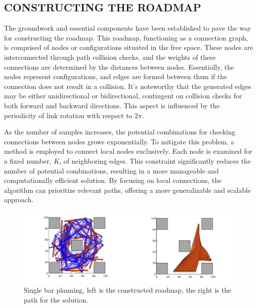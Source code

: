 \documentclass{IEEEtaes}
\begin{document}
\subsection{\fontsize{10}{13}\selectfont CONSTRUCTING THE ROADMAP}
The groundwork and essential components have been established to pave the way for constructing the roadmap. This roadmap, functioning as a connection graph, is comprised of nodes or configurations situated in the free space. These nodes are interconnected through path collision checks, and the weights of these connections are determined by the distances between nodes. Essentially, the nodes represent configurations, and edges are formed between them if the connection does not result in a collision. It's noteworthy that the generated edges may be either unidirectional or bidirectional, contingent on collision checks for both forward and backward directions. This aspect is influenced by the periodicity of link rotation with respect to $2\pi$.

As the number of samples increases, the potential combinations for checking connections between nodes grows exponentially. To mitigate this problem, a method is employed to connect local nodes exclusively. Each node is examined for a fixed number, $K$, of neighboring edges. This constraint significantly reduces the number of potential combinations, resulting in a more manageable and computationally efficient solution. By focusing on local connections, the algorithm can prioritize relevant paths, offering a more generalizable and scalable approach.

\begin{figure}[b!]
    \begin{center}
        \includegraphics[width=1\linewidth]{figures/EXP1-1.pdf}
     \end{center}
     \vspace{-1em}
     \caption{Single bar planning, left is the constructed roadmap, the right is the path for the solution.}
     \label{bar-1}
     \vspace{-1em}
\end{figure}
\end{document}
